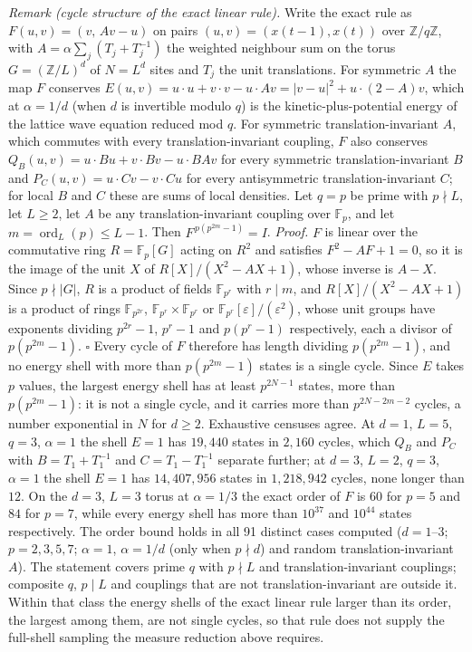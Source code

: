 \documentclass[
]{article}
\begin{document}
\emph{Remark (cycle structure of the exact linear rule).} Write the
exact rule as \(F(u,v)=(v,\,Av-u)\) on pairs \((u,v)=(x(t-1),x(t))\)
over \(\mathbb{Z}/q\mathbb{Z}\), with \(A=\alpha\sum_j(T_j+T_j^{-1})\)
the weighted neighbour sum on the torus \(G=(\mathbb{Z}/L)^d\) of
\(N=L^d\) sites and \(T_j\) the unit translations. For symmetric \(A\)
the map \(F\) conserves
\(E(u,v)=u\cdot u+v\cdot v-u\cdot Av=|v-u|^2+u\cdot(2-A)v\), which at
\(\alpha=1/d\) (when \(d\) is invertible modulo \(q\)) is the
kinetic-plus-potential energy of the lattice wave equation reduced mod
\(q\). For symmetric translation-invariant \(A\), which commutes with
every translation-invariant coupling, \(F\) also conserves
\(Q_B(u,v)=u\cdot Bu+v\cdot Bv-u\cdot BAv\) for every symmetric
translation-invariant \(B\) and \(P_C(u,v)=u\cdot Cv-v\cdot Cu\) for
every antisymmetric translation-invariant \(C\); for local \(B\) and
\(C\) these are sums of local densities. Let \(q=p\) be prime with
\(p\nmid L\), let \(L\ge2\), let \(A\) be any translation-invariant
coupling over \(\mathbb{F}_p\), and let
\(m=\operatorname{ord}_L(p)\le L-1\). Then \(F^{\,p(p^{2m}-1)}=I\).
\emph{Proof.} \(F\) is linear over the commutative ring
\(R=\mathbb{F}_p[G]\) acting on \(R^2\) and satisfies \(F^2-AF+1=0\), so
it is the image of the unit \(X\) of \(R[X]/(X^2-AX+1)\), whose inverse
is \(A-X\). Since \(p\nmid|G|\), \(R\) is a product of fields
\(\mathbb{F}_{p^r}\) with \(r\mid m\), and \(R[X]/(X^2-AX+1)\) is a
product of rings \(\mathbb{F}_{p^{2r}}\),
\(\mathbb{F}_{p^r}\times\mathbb{F}_{p^r}\) or
\(\mathbb{F}_{p^r}[\varepsilon]/(\varepsilon^2)\), whose unit groups
have exponents dividing \(p^{2r}-1\), \(p^r-1\) and \(p(p^r-1)\)
respectively, each a divisor of \(p(p^{2m}-1)\). \(\square\) Every cycle
of \(F\) therefore has length dividing \(p(p^{2m}-1)\), and no energy
shell with more than \(p(p^{2m}-1)\) states is a single cycle. Since
\(E\) takes \(p\) values, the largest energy shell has at least
\(p^{2N-1}\) states, more than \(p(p^{2m}-1)\): it is not a single
cycle, and it carries more than \(p^{2N-2m-2}\) cycles, a number
exponential in \(N\) for \(d\ge2\). Exhaustive censuses agree. At
\(d=1\), \(L=5\), \(q=3\), \(\alpha=1\) the shell \(E=1\) has
\(19{,}440\) states in \(2{,}160\) cycles, which \(Q_B\) and \(P_C\)
with \(B=T_1+T_1^{-1}\) and \(C=T_1-T_1^{-1}\) separate further; at
\(d=3\), \(L=2\), \(q=3\), \(\alpha=1\) the shell \(E=1\) has
\(14{,}407{,}956\) states in \(1{,}218{,}942\) cycles, none longer than
\(12\). On the \(d=3\), \(L=3\) torus at \(\alpha=1/3\) the exact order
of \(F\) is \(60\) for \(p=5\) and \(84\) for \(p=7\), while every
energy shell has more than \(10^{37}\) and \(10^{44}\) states
respectively. The order bound holds in all 91 distinct cases computed
(\(d=1\)--\(3\); \(p=2,3,5,7\); \(\alpha=1\), \(\alpha=1/d\) (only when
\(p\nmid d\)) and random translation-invariant \(A\)). The statement
covers prime \(q\) with \(p\nmid L\) and translation-invariant
couplings; composite \(q\), \(p\mid L\) and couplings that are not
translation-invariant are outside it. Within that class the energy
shells of the exact linear rule larger than its order, the largest among
them, are not single cycles, so that rule does not supply the full-shell
sampling the measure reduction above requires.
\end{document}
